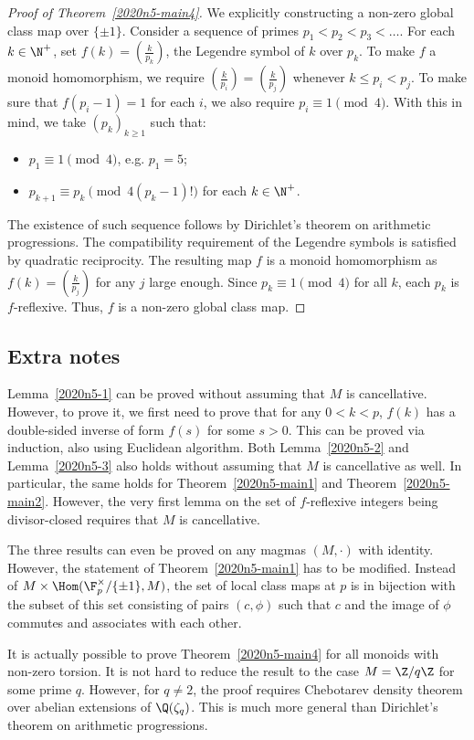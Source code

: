 \begin{proof}[Proof of Theorem~\ref{2020n5-main4}]
We explicitly constructing a non-zero global class map over $\{\pm 1\}$.
Consider a sequence of primes $p_1 < p_2 < p_3 < \ldots$.
For each $k \in \N^+$, set $f(k) = \left(\frac{k}{p_k}\right)$, the Legendre symbol of $k$ over $p_k$.
To make $f$ a monoid homomorphism, we require $\left(\frac{k}{p_i}\right) = \left(\frac{k}{p_j}\right)$ whenever $k \leq p_i < p_j$.
To make sure that $f(p_i - 1) = 1$ for each $i$, we also require $p_i \equiv 1 \pmod{4}$.
With this in mind, we take $(p_k)_{k \geq 1}$ such that:
\begin{itemize}
    \item   $p_1 \equiv 1 \pmod{4}$, e.g. $p_1 = 5$;
    \item   $p_{k + 1} \equiv p_k \pmod{4 (p_k - 1)!}$ for each $k \in \N^+$.
\end{itemize}

The existence of such sequence follows by Dirichlet's theorem on arithmetic progressions.
The compatibility requirement of the Legendre symbols is satisfied by quadratic reciprocity.
The resulting map $f$ is a monoid homomorphism as $f(k) = \left(\frac{k}{p_j}\right)$ for any $j$ large enough.
Since $p_k \equiv 1 \pmod{4}$ for all $k$, each $p_k$ is $f$-reflexive.
Thus, $f$ is a non-zero global class map.
\end{proof}





\subsection*{Extra notes}

Lemma~\ref{2020n5-1} can be proved without assuming that $M$ is cancellative.
However, to prove it, we first need to prove that for any $0 < k < p$, $f(k)$ has a double-sided inverse of form $f(s)$ for some $s > 0$.
This can be proved via induction, also using Euclidean algorithm.
Both Lemma~\ref{2020n5-2} and Lemma~\ref{2020n5-3} also holds without assuming that $M$ is cancellative as well.
In particular, the same holds for Theorem~\ref{2020n5-main1} and Theorem~\ref{2020n5-main2}.
However, the very first lemma on the set of $f$-reflexive integers being divisor-closed requires that $M$ is cancellative.

The three results can even be proved on any magmas $(M, \cdot)$ with identity.
However, the statement of Theorem~\ref{2020n5-main1} has to be modified.
Instead of $M \times \Hom(\F_p^{\times}/\{\pm 1\}, M)$, the set of local class maps at $p$ is in bijection with the subset of this set consisting of pairs $(c, \phi)$ such that $c$ and the image of $\phi$ commutes and associates with each other.

It is actually possible to prove Theorem~\ref{2020n5-main4} for all monoids with non-zero torsion.
It is not hard to reduce the result to the case $M = \Z/q\Z$ for some prime $q$.
However, for $q \neq 2$, the proof requires Chebotarev density theorem over abelian extensions of $\Q(\zeta_q)$.
This is much more general than Dirichlet's theorem on arithmetic progressions.
